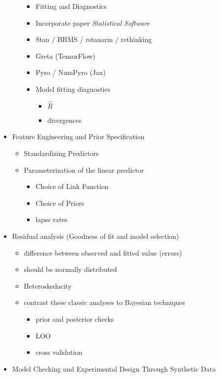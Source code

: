 \documentclass[
]{article}
\providecommand{\tightlist}{%
  \setlength{\itemsep}{0pt}\setlength{\parskip}{0pt}}
\begin{document}
\begin{itemize}
\begin{itemize}
    \begin{itemize}
    \tightlist
    \item
      Fitting and Diagnostics
    \item
      Incorporate paper \emph{Statistical Software}
    \item
      Stan / BRMS / rstanarm / rethinking
    \item
      Greta (TensorFlow)
    \item
      Pyro / NumPyro (Jax)
    \item
      Model fitting diagnostics

      \begin{itemize}
      \tightlist
      \item
        \(\hat{R}\)
      \item
        divergences
      \end{itemize}
    \end{itemize}
  \end{itemize}
\item
  Feature Engineering and Prior Specification

  \begin{itemize}
  \tightlist
  \item
    Standardizing Predictors
  \item
    Parameterization of the linear predictor

    \begin{itemize}
    \tightlist
    \item
      Choice of Link Function
    \item
      Choice of Priors
    \item
      lapse rates
    \end{itemize}
  \end{itemize}
\item
  Residual analysis (Goodness of fit and model selection)

  \begin{itemize}
  \tightlist
  \item
    difference between observed and fitted value (errors)
  \item
    should be normally distributed
  \item
    Heteroskedacity
  \item
    contrast these classic analyses to Bayesian techniques

    \begin{itemize}
    \tightlist
    \item
      prior and posterior checks
    \item
      LOO
    \item
      cross validation
    \end{itemize}
  \end{itemize}
\item
  Model Checking and Experimental Design Through Synthetic Data


\end{itemize}
\end{document}
